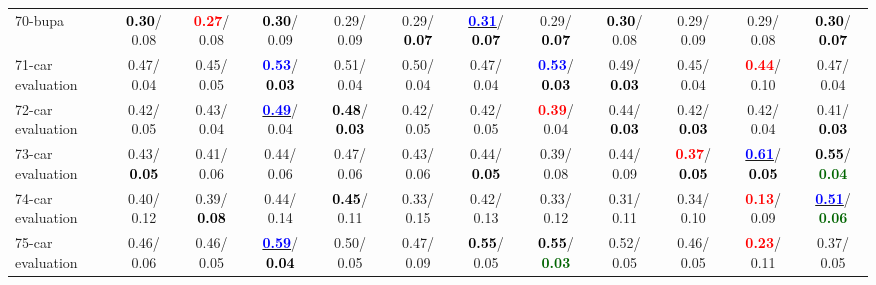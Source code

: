 \begin{table}[h]
\begin{center}
{\begin{tabular}{lc|c|c|c|c|c|c|c|c|c|c}
70-bupa & \textcolor{black}{\textbf{  0.30}}/  0.08 & \textcolor{red}{\textbf{  0.27}}/  0.08 & \textcolor{black}{\textbf{  0.30}}/  0.09 &   0.29/  0.09 &   0.29/\textcolor{black}{\textbf{  0.07}} & \underline{\textcolor{blue}{\textbf{  0.31}}}/\textcolor{black}{\textbf{  0.07}} &   0.29/\textcolor{black}{\textbf{  0.07}} & \textcolor{black}{\textbf{  0.30}}/  0.08 &   0.29/  0.09 &   0.29/  0.08 & \textcolor{black}{\textbf{  0.30}}/\textcolor{black}{\textbf{  0.07}} \\
71-car evaluation &   0.47/  0.04 &   0.45/  0.05 & \textcolor{blue}{\textbf{  0.53}}/\textcolor{black}{\textbf{  0.03}} &   0.51/  0.04 &   0.50/  0.04 &   0.47/  0.04 & \textcolor{blue}{\textbf{  0.53}}/\textcolor{black}{\textbf{  0.03}} &   0.49/\textcolor{black}{\textbf{  0.03}} &   0.45/  0.04 & \textcolor{red}{\textbf{  0.44}}/  0.10 &   0.47/  0.04 \\ \hline
72-car evaluation &   0.42/  0.05 &   0.43/  0.04 & \underline{\textcolor{blue}{\textbf{  0.49}}}/  0.04 & \textcolor{black}{\textbf{  0.48}}/\textcolor{black}{\textbf{  0.03}} &   0.42/  0.05 &   0.42/  0.05 & \textcolor{red}{\textbf{  0.39}}/  0.04 &   0.44/\textcolor{black}{\textbf{  0.03}} &   0.42/\textcolor{black}{\textbf{  0.03}} &   0.42/  0.04 &   0.41/\textcolor{black}{\textbf{  0.03}} \\
73-car evaluation &   0.43/\textcolor{black}{\textbf{  0.05}} &   0.41/  0.06 &   0.44/  0.06 &   0.47/  0.06 &   0.43/  0.06 &   0.44/\textcolor{black}{\textbf{  0.05}} &   0.39/  0.08 &   0.44/  0.09 & \textcolor{red}{\textbf{  0.37}}/\textcolor{black}{\textbf{  0.05}} & \underline{\textcolor{blue}{\textbf{  0.61}}}/\textcolor{black}{\textbf{  0.05}} & \textcolor{black}{\textbf{  0.55}}/\textcolor{darkgreen}{\textbf{  0.04}} \\
74-car evaluation &   0.40/  0.12 &   0.39/\textcolor{black}{\textbf{  0.08}} &   0.44/  0.14 & \textcolor{black}{\textbf{  0.45}}/  0.11 &   0.33/  0.15 &   0.42/  0.13 &   0.33/  0.12 &   0.31/  0.11 &   0.34/  0.10 & \textcolor{red}{\textbf{  0.13}}/  0.09 & \underline{\textcolor{blue}{\textbf{  0.51}}}/\textcolor{darkgreen}{\textbf{  0.06}} \\
75-car evaluation &   0.46/  0.06 &   0.46/  0.05 & \underline{\textcolor{blue}{\textbf{  0.59}}}/\textcolor{black}{\textbf{  0.04}} &   0.50/  0.05 &   0.47/  0.09 & \textcolor{black}{\textbf{  0.55}}/  0.05 & \textcolor{black}{\textbf{  0.55}}/\textcolor{darkgreen}{\textbf{  0.03}} &   0.52/  0.05 &   0.46/  0.05 & \textcolor{red}{\textbf{  0.23}}/  0.11 &   0.37/  0.05 \\

\end{tabular}}
\end{center}
\end{table}
